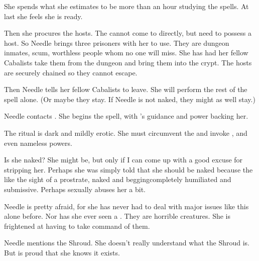 She spends what she estimates to be more than an hour studying the spells. 
At last she feels she is ready.



\begin{comment}
  \section{Hosts are brought in}
\end{comment}

Then she procures the hosts.
The \banes{} cannot come to \Miith{} directly, but need to possess a \human{} host. 
So Needle brings three prisoners with her to use. 
They are dungeon inmates, scum, worthless people whom no one will miss. 
She has had her fellow Cabalists take them from the dungeon and bring them into the crypt. 
The hosts are securely chained so they cannot escape. 

Then Needle tells her fellow Cabalists to leave.
She will perform the rest of the spell alone. 
(Or maybe they stay. If Needle is not naked, they might as well stay.)







\begin{comment}
  \section{Needle begins spell}
\end{comment}
Needle contacts \Achsah. 
She begins the spell, with \Achsah's guidance and power backing her. 

The ritual is dark and mildly erotic. 
She must circumvent the \Sephiroth{} and invoke \Qliphoth{}, and even nameless powers. 

Is she naked? 
She might be, but only if I can come up with a good excuse for stripping her. 
Perhaps she was simply told that she should be naked because the \resphain{} like the sight of a \human{} prostrate, naked and begging\dash completely humiliated and submissive. 
Perhaps \Achsah{} sexually abuses her a bit. 

Needle is pretty afraid, for she has never had to deal with major issues like this alone before. 
Nor has she ever seen a \bane. 
They are horrible creatures. 
She is frightened at having to take command of them. 

Needle mentions the Shroud. 
She doesn't really understand what the Shroud is. 
But is proud that she knows it exists. 

